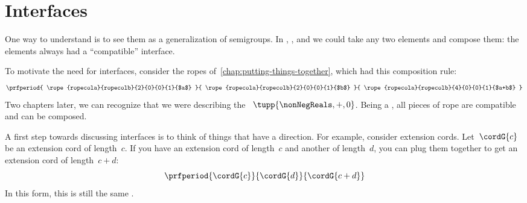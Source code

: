 
\section{Interfaces}\label{sec:interfaces}

One way to understand  is to see them as a generalization of semigroups.
In , , and  we could take any two elements and compose them: the elements always had a ``compatible'' interface.

To motivate the need for interfaces, consider the ropes of~\cref{chap:putting-things-together}, which had this composition rule:
%
\begin{equation}
    \prfperiod{
        \rope{ropecola}{ropecolb}{2}{0}{0}{1}{$a$}
    }{
        \rope{ropecola}{ropecolb}{2}{0}{0}{1}{$b$}
    }{
        \rope{ropecola}{ropecolb}{4}{0}{0}{1}{$a+b$}
    }
\end{equation}
%
Two chapters later, we can recognize that we were describing the  ~$\tupp{\nonNegReals,+, 0}$.
Being a , all pieces of rope are compatible and can be composed.

A first step towards discussing interfaces is to think of things that have a direction.
For example, consider extension cords.
Let~$\cordG{c}$ be an extension cord of length~$c$.
If you have an extension cord of length~$c$ and another of length~$d$, you can plug them together to get an extension cord of length~$c+d$:
%
\begin{equation}
    \label{eq:cords}
    \prfperiod{
        \cordG{c}
    }{
        \cordG{d}
    }{
        \cordG{c+d}
    }
\end{equation}
%
In this form, this is still the same .

